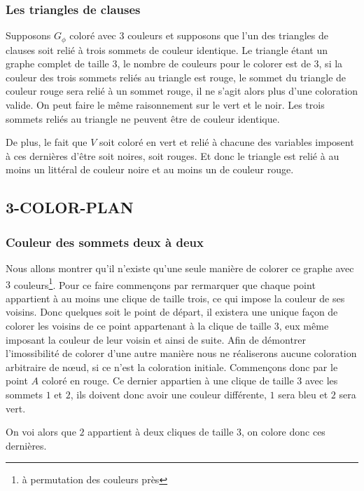 \subsubsection{Les triangles de clauses}

Supposons $G_\phi$ coloré avec 3 couleurs et supposons que l'un des triangles de clauses soit relié
à trois sommets de couleur identique. Le triangle étant un graphe complet de taille 3, le nombre de
couleurs pour le colorer est de 3, si la couleur des trois sommets reliés au triangle est rouge, le
sommet du triangle de couleur rouge sera relié à un sommet rouge, il ne s'agit alors plus d'une
coloration valide. On peut faire le même raisonnement
sur le vert et le noir. Les trois sommets reliés au triangle ne peuvent être de couleur identique.

De plus, le fait que $V$ soit coloré en vert et relié à chacune des variables imposent à ces
dernières d'être soit noires, soit rouges. Et donc le triangle est relié à au moins un littéral de
couleur noire et au moins un de couleur rouge.

\subsection{3-COLOR-PLAN}

\subsubsection{Couleur des sommets deux à deux}

Nous allons montrer qu'il n'existe qu'une seule manière de colorer ce graphe avec $3$
couleurs\footnote{à permutation des couleurs près}. Pour ce faire commençons par rermarquer que
chaque point appartient à au moins une clique de taille trois, ce qui impose la couleur de ses
voisins. Donc quelques soit le point de départ, il existera une unique façon de colorer les voisins
de ce point appartenant à la clique de taille 3, eux même imposant la couleur de leur voisin et
ainsi de suite. 
Afin de démontrer l'imossibilité de colorer d'une autre manière nous ne réaliserons aucune
coloration arbitraire de n\oe ud, si ce n'est la coloration initiale. Commençons donc par le point
$A$ coloré en rouge. Ce dernier appartien à une clique de taille $3$ avec les sommets $1$ et $2$,
ils doivent donc avoir une couleur différente, $1$ sera bleu et $2$ sera vert. 



On voi alors que $2$ appartient à deux cliques de taille 3, on colore donc ces dernières.

